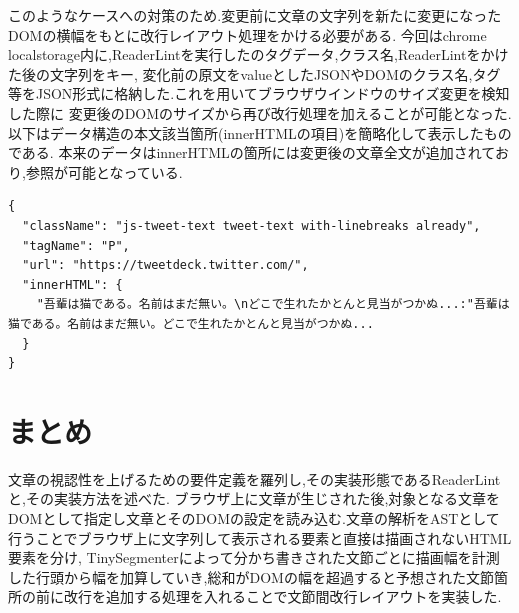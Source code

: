 このようなケースへの対策のため.変更前に文章の文字列を新たに変更になったDOMの横幅をもとに改行レイアウト処理をかける必要がある.
今回はchrome localstorage内に,ReaderLintを実行したのタグデータ,クラス名,ReaderLintをかけた後の文字列をキー,
変化前の原文をvalueとしたJSONやDOMのクラス名,タグ等をJSON形式に格納した.これを用いてブラウザウインドウのサイズ変更を検知した際に
変更後のDOMのサイズから再び改行処理を加えることが可能となった.以下はデータ構造の本文該当箇所(innerHTMLの項目)を簡略化して表示したものである.
本来のデータはinnerHTMLの箇所には変更後の文章全文が追加されており,参照が可能となっている.

\newpage

\begin{lstlisting}
{
  "className": "js-tweet-text tweet-text with-linebreaks already",
  "tagName": "P",
  "url": "https://tweetdeck.twitter.com/",
  "innerHTML": {
    "吾輩は猫である。名前はまだ無い。\nどこで生れたかとんと見当がつかぬ...:"吾輩は猫である。名前はまだ無い。どこで生れたかとんと見当がつかぬ...
  }
}
\end{lstlisting}

\section{まとめ}
文章の視認性を上げるための要件定義を羅列し,その実装形態であるReaderLintと,その実装方法を述べた.
ブラウザ上に文章が生じされた後,対象となる文章をDOMとして指定し文章とそのDOMの設定を読み込む.文章の解析をASTとして行うことでブラウザ上に文字列して表示される要素と直接は描画されないHTML要素を分け,
TinySegmenterによって分かち書きされた文節ごとに描画幅を計測した行頭から幅を加算していき,総和がDOMの幅を超過すると予想された文節箇所の前に改行を追加する処理を入れることで文節間改行レイアウトを実装した.

